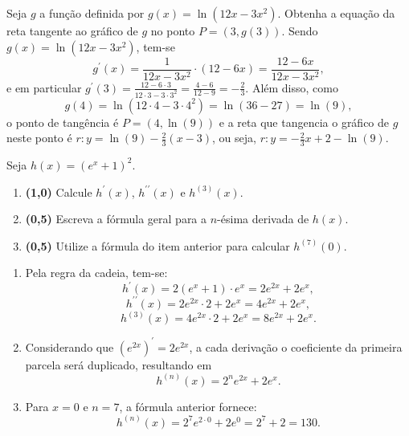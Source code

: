 \documentclass[12pt,a4paper]{article}
\begin{document}
\begin{ExerciseList}
\Exercise[title={2,0}] Seja $g$ a função definida por $g(x) = \ln(12x-3x^2)$. Obtenha a equação da reta tangente ao gráfico de $g$ no ponto $P=(3, g(3))$.
\Answer Sendo $g(x) = \ln(12x-3x^2)$, tem-se
\[
g^\prime(x) = \frac{1}{12x-3x^2} \cdot(12-6x) = \frac{12-6x}{12x-3x^2},
\]
e em particular $g^\prime(3) = \frac{12-6 \cdot 3}{12\cdot 3-3 \cdot 3^2} = \frac{4-6}{12-9} = -\frac{2}{3}$. Além disso, como
\[
g(4) = \ln(12 \cdot 4 - 3 \cdot 4^2) = \ln(36-27) = \ln(9),
\]
o ponto de tangência é $P = (4, \ln(9))$ e a reta que tangencia o gráfico de $g$ neste ponto é $r: y=\ln(9)-\frac{2}{3}(x-3)$, ou seja,
$r: y=-\frac{2}{3}x + 2 - \ln(9)$.

\Exercise%
Seja $h(x)=(e^x + 1)^2$.
\begin{enumerate}
\item \textbf{(1,0)} Calcule $h^\prime(x)$, $h^{\prime\prime}(x)$ e $h^{(3)}(x)$.
\item \textbf{(0,5)} Escreva a fórmula geral para a $n$-ésima derivada de $h(x)$.
\item \textbf{(0,5)} Utilize a fórmula do item anterior para calcular $h^{(7)}(0)$.
\end{enumerate}
\Answer
\begin{enumerate}
\item Pela regra da cadeia, tem-se:
\[
h^\prime(x)
= 2(e^x + 1) \cdot e^x
= 2e^{2x} + 2e^x,
\]
\[
h^{\prime\prime}(x)
= 2e^{2x}\cdot 2 + 2e^x
= 4e^{2x} + 2e^x,
\]
\[
h^{(3)}(x)
= 4e^{2x}\cdot 2 + 2e^x
= 8e^{2x} + 2e^x.
\]
\item Considerando que $(e^{2x})^\prime = 2 e^{2x}$, a cada derivação o coeficiente da primeira parcela será duplicado, resultando em
\[
h^{(n)}(x)
= 2^{n}e^{2x} + 2e^x.
\]
\item Para $x = 0$ e $n = 7$, a fórmula anterior fornece:
\[
h^{(n)}(x)
= 2^{7}e^{2 \cdot 0} + 2e^0
= 2^{7} + 2 = 130.
\]
\end{enumerate}


\end{ExerciseList}
\end{document}
